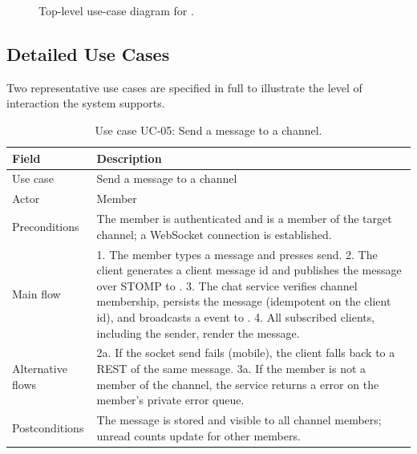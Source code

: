 \begin{figure}[htbp]
\caption{Top-level use-case diagram for \voname{}.}
\label{fig:usecase-overview}
\end{figure}

\subsection{Detailed Use Cases}

Two representative use cases are specified in full to illustrate the level of
interaction the system supports.

\begin{table}[htbp]
\centering
\caption{Use case UC-05: Send a message to a channel.}
\label{tab:uc-send}
\small
\begin{tabularx}{\textwidth}{L{3.0cm} X}
\toprule
\textbf{Field} & \textbf{Description} \\
\midrule
Use case & Send a message to a channel \\
Actor & Member \\
Preconditions & The member is authenticated and is a member of the target channel; a WebSocket connection is established. \\
Main flow &
1. The member types a message and presses send.
2. The client generates a client message id and publishes the message over STOMP to .
3. The chat service verifies channel membership, persists the message (idempotent on the client id), and broadcasts a  event to .
4. All subscribed clients, including the sender, render the message. \\
Alternative flows &
2a. If the socket send fails (mobile), the client falls back to a REST  of the same message.
3a. If the member is not a member of the channel, the service returns a  error on the member's private error queue. \\
Postconditions & The message is stored and visible to all channel members; unread counts update for other members. \\
\bottomrule
\end{tabularx}
\end{table}

